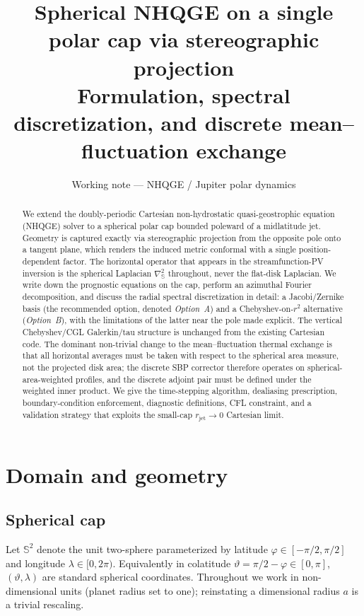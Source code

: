 \documentclass[11pt]{article}
\title{Spherical NHQGE on a single polar cap via stereographic projection \\
{\large Formulation, spectral discretization, and discrete mean--fluctuation exchange}}
\author{Working note --- NHQGE / Jupiter polar dynamics}
\date{}
\newcommand{\Lapsphere}{\nabla^2_{\!\mathbb{S}}}
\newcommand{\rjet}{r_{\mathrm{jet}}}
\begin{document}
\maketitle

\begin{abstract}
We extend the doubly-periodic Cartesian non-hydrostatic quasi-geostrophic
equation (NHQGE) solver to a spherical polar cap bounded poleward of a
midlatitude jet. Geometry is captured exactly via stereographic projection
from the opposite pole onto a tangent plane, which renders the induced
metric conformal with a single position-dependent factor.  The horizontal
operator that appears in the streamfunction-PV inversion is the spherical
Laplacian $\Lapsphere$ throughout, never the flat-disk Laplacian.  We
write down the prognostic equations on the cap, perform an azimuthal
Fourier decomposition, and discuss the radial spectral discretization in
detail: a Jacobi/Zernike basis (the recommended option, denoted
\emph{Option~A}) and a Chebyshev-on-$r^{2}$ alternative (\emph{Option~B}),
with the limitations of the latter near the pole made explicit.  The
vertical Chebyshev/CGL Galerkin/tau structure is unchanged from the
existing Cartesian code.  The dominant non-trivial change to the
mean--fluctuation thermal exchange is that all horizontal averages must
be taken with respect to the spherical area measure, not the projected
disk area; the discrete SBP corrector therefore operates on
spherical-area-weighted profiles, and the discrete adjoint pair must be
defined under the weighted inner product.  We give the time-stepping
algorithm, dealiasing prescription, boundary-condition enforcement,
diagnostic definitions, CFL constraint, and a validation strategy that
exploits the small-cap $\rjet \to 0$ Cartesian limit.
\end{abstract}

\tableofcontents

\section{Domain and geometry}

\subsection{Spherical cap}

Let $\mathbb{S}^2$ denote the unit two-sphere parameterized by latitude
$\varphi \in [-\pi/2, \pi/2]$ and longitude $\lambda \in [0, 2\pi)$.
Equivalently in colatitude $\vartheta = \pi/2 - \varphi \in [0, \pi]$,
$(\vartheta, \lambda)$ are standard spherical coordinates.  Throughout
we work in non-dimensional units (planet radius set to one); reinstating
a dimensional radius $a$ is a trivial rescaling.
\end{document}
